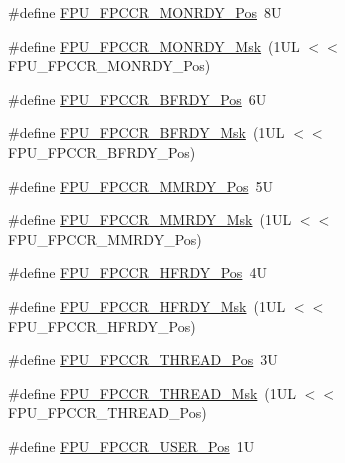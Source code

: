 \begin{DoxyCompactItemize}
\item 
\#define \mbox{\hyperlink{group___c_m_s_i_s___f_p_u_gae0a4effc79209d821ded517c2be326ba}{F\+P\+U\+\_\+\+F\+P\+C\+C\+R\+\_\+\+M\+O\+N\+R\+D\+Y\+\_\+\+Pos}}~8U
\item 
\#define \mbox{\hyperlink{group___c_m_s_i_s___f_p_u_ga42067729a887081cf56b8fe1029be7a1}{F\+P\+U\+\_\+\+F\+P\+C\+C\+R\+\_\+\+M\+O\+N\+R\+D\+Y\+\_\+\+Msk}}~(1\+U\+L $<$$<$ F\+P\+U\+\_\+\+F\+P\+C\+C\+R\+\_\+\+M\+O\+N\+R\+D\+Y\+\_\+\+Pos)
\item 
\#define \mbox{\hyperlink{group___c_m_s_i_s___f_p_u_ga6d633920f92c3ce4133d769701619b17}{F\+P\+U\+\_\+\+F\+P\+C\+C\+R\+\_\+\+B\+F\+R\+D\+Y\+\_\+\+Pos}}~6U
\item 
\#define \mbox{\hyperlink{group___c_m_s_i_s___f_p_u_gad349eb1323d8399d54a04c0bfd520cb2}{F\+P\+U\+\_\+\+F\+P\+C\+C\+R\+\_\+\+B\+F\+R\+D\+Y\+\_\+\+Msk}}~(1\+U\+L $<$$<$ F\+P\+U\+\_\+\+F\+P\+C\+C\+R\+\_\+\+B\+F\+R\+D\+Y\+\_\+\+Pos)
\item 
\#define \mbox{\hyperlink{group___c_m_s_i_s___f_p_u_gaccdb481211629f9440431439231187f1}{F\+P\+U\+\_\+\+F\+P\+C\+C\+R\+\_\+\+M\+M\+R\+D\+Y\+\_\+\+Pos}}~5U
\item 
\#define \mbox{\hyperlink{group___c_m_s_i_s___f_p_u_gadedfaec9fdd07261573e823a4dcfb5c4}{F\+P\+U\+\_\+\+F\+P\+C\+C\+R\+\_\+\+M\+M\+R\+D\+Y\+\_\+\+Msk}}~(1\+U\+L $<$$<$ F\+P\+U\+\_\+\+F\+P\+C\+C\+R\+\_\+\+M\+M\+R\+D\+Y\+\_\+\+Pos)
\item 
\#define \mbox{\hyperlink{group___c_m_s_i_s___f_p_u_gab12733991487acc2da41ca300fe36fb6}{F\+P\+U\+\_\+\+F\+P\+C\+C\+R\+\_\+\+H\+F\+R\+D\+Y\+\_\+\+Pos}}~4U
\item 
\#define \mbox{\hyperlink{group___c_m_s_i_s___f_p_u_gaf4beaa279abff34828344bd594fff8a1}{F\+P\+U\+\_\+\+F\+P\+C\+C\+R\+\_\+\+H\+F\+R\+D\+Y\+\_\+\+Msk}}~(1\+U\+L $<$$<$ F\+P\+U\+\_\+\+F\+P\+C\+C\+R\+\_\+\+H\+F\+R\+D\+Y\+\_\+\+Pos)
\item 
\#define \mbox{\hyperlink{group___c_m_s_i_s___f_p_u_ga0937d64c42374200af44b22e5b49fd26}{F\+P\+U\+\_\+\+F\+P\+C\+C\+R\+\_\+\+T\+H\+R\+E\+A\+D\+\_\+\+Pos}}~3U
\item 
\#define \mbox{\hyperlink{group___c_m_s_i_s___f_p_u_ga8d18cd88336d63d4b1810383aa8da700}{F\+P\+U\+\_\+\+F\+P\+C\+C\+R\+\_\+\+T\+H\+R\+E\+A\+D\+\_\+\+Msk}}~(1\+U\+L $<$$<$ F\+P\+U\+\_\+\+F\+P\+C\+C\+R\+\_\+\+T\+H\+R\+E\+A\+D\+\_\+\+Pos)
\item 
\#define \mbox{\hyperlink{group___c_m_s_i_s___f_p_u_gaea663104375ce6be15470e3db294c92d}{F\+P\+U\+\_\+\+F\+P\+C\+C\+R\+\_\+\+U\+S\+E\+R\+\_\+\+Pos}}~1U
$$
\end{DoxyCompactItemize}
